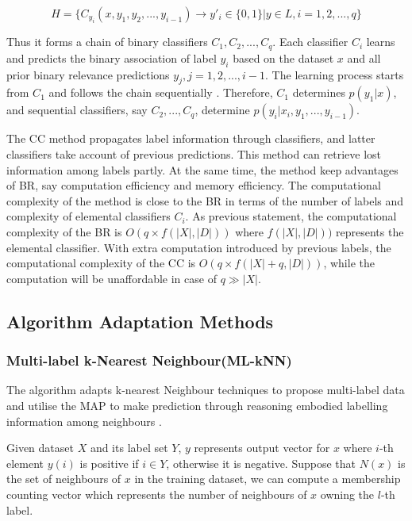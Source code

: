 \begin{equation}\label{eq:ClassifierChains}
H = \{C_{y_{i}}(x, y_{1},y_{2},...,y_{i-1}) \to y'_{i} \in \{0,1\}| y \in L, i = 1,2,...,q\}
\end{equation}

Thus it forms a chain of binary classifiers $C_{1},C_{2},...,C_{q}$. Each classifier $C_{i}$ learns and predicts the binary association of label $y_{i}$ based on the dataset $x$ and all prior binary relevance predictions $y_{j}, j = 1,2,...,i-1$. The learning process starts from $C_{1}$ and follows the chain sequentially . Therefore, $C_{1}$ determines $p(y_{1}|x)$, and sequential classifiers, say $C_{2},...,C_{q}$, determine $p(y_{i}|x_{i},y_{1},...,y_{i-1})$.

The CC method propagates label information through classifiers, and latter classifiers take account of previous predictions. This method can retrieve lost information among labels partly. At the same time, the method keep advantages of BR, say computation efficiency and memory efficiency. The computational complexity of the method is close to the BR in terms of the number of labels and complexity of elemental classifiers $C_{i}$. As previous statement, the computational complexity of the BR is $O(q \times f(|X|,|D|))$ where $f(|X|,|D|))$ represents the elemental classifier. With extra computation introduced by previous labels, the computational complexity of the CC is $O(q \times f(|X|+q,|D|))$, while the computation will be unaffordable in case of $q \gg |X|$.

\subsection{Algorithm Adaptation Methods}

\subsubsection{Multi-label k-Nearest Neighbour(ML-kNN)}

The algorithm adapts k-nearest Neighbour techniques to propose multi-label data and utilise the MAP to make prediction through reasoning embodied labelling information among neighbours \citep{zhang2007ml}.

Given dataset $X$ and its label set $Y$, $y$ represents output vector for $x$ where $i$-th element $y(i)$ is positive if $i \in Y$, otherwise it is negative. Suppose that $N(x)$ is the set of neighbours of $x$ in the training dataset, we can compute a membership counting vector which represents the number of neighbours of $x$ owning the $l$-th label.

